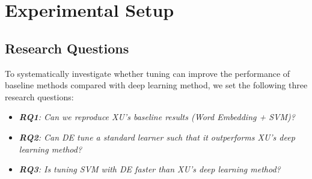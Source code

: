 \documentclass[sigconf]{acmart}
\theoremstyle{break}
\newcommand{\bi}{\begin{itemize}[leftmargin=0.4cm]}
\newcommand{\ei}{\end{itemize}}
\begin{document}
 





\section{Experimental Setup}\label{experiment}
\subsection{Research Questions}\label{RQ}
 To systematically investigate whether tuning can improve the 
 performance of baseline methods compared with deep learning method, we set
 the following three research questions:
 

 
 \bi
 \item {\it \textbf{RQ1}: Can we reproduce XU's baseline results (Word Embedding + SVM)?}
 \item {\it \textbf{RQ2}: Can   DE   tune a standard learner such that
 it outperforms XU's deep learning method?}
 \item {\it \textbf{RQ3}: Is tuning SVM with DE faster than XU's deep learning method?}
 \ei
 
\end{document}
